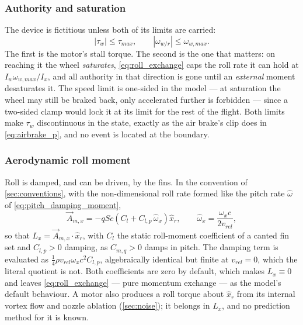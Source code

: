 \begin{aitext}
\subsubsection{Authority and saturation}\label{sec:roll_saturation}
The device is fictitious unless both of its limits are carried:
\begin{equation} \label{eq:roll_limits}
    \left|\tau_w\right| \leq \tau_{max}, \qquad
    \left|\omega_{w/r}\right| \leq \omega_{w,max}.
\end{equation}
The first is the motor's stall torque. The second is the one that matters: on reaching it the wheel
\emph{saturates}, \autoref{eq:roll_exchange} caps the roll rate it can hold at
$I_w\omega_{w,max}/I_x$, and all authority in that direction is gone until an \emph{external}
moment desaturates it. The speed limit is one-sided in the model --- at saturation the wheel may
still be braked back, only accelerated further is forbidden --- since a two-sided clamp would lock
it at its limit for the rest of the flight. Both limits make $\tau_w$ discontinuous in the state,
exactly as the air brake's $\mathrm{clip}$ does in \autoref{eq:airbrake_p}, and no event is located
at the boundary.

\subsubsection{Aerodynamic roll moment}\label{sec:roll_aero}
Roll is damped, and can be driven, by the fins. In the convention of \autoref{sec:conventions},
with the non-dimensional roll rate formed like the pitch rate $\hat\omega$ of
\autoref{eq:pitch_damping_moment},
\begin{equation} \label{eq:roll_aero_moment}
    \vec{A}_{m,x} = -qSc\left(C_l + C_{l,p}\,\hat\omega_x\right)\hat{x}_r, \qquad
    \hat\omega_x = \frac{\omega_x c}{2v_{rel}},
\end{equation}
so that $L_x=\vec{A}_{m,x}\cdot\hat{x}_r$, with $C_l$ the static roll-moment coefficient of a
canted fin set and $C_{l,p}>0$ damping, as $C_{m,q}>0$ damps in pitch. The damping term is
evaluated as $\tfrac14\rho v_{rel}\omega_x c^2 C_{l,p}$, algebraically identical but finite at
$v_{rel}=0$, which the literal quotient is not. Both coefficients are zero by
default, which makes $L_x\equiv0$ and leaves \autoref{eq:roll_exchange} --- pure momentum exchange
--- as the model's default behaviour. A motor also produces a roll torque about $\hat{x}_r$ from its
internal vortex flow and nozzle ablation (\autoref{sec:noise}); it belongs in $L_x$, and no
prediction method for it is known.


\end{aitext}
